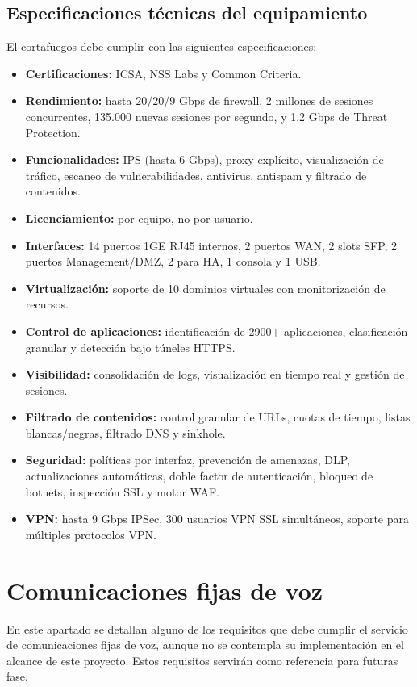 \subsection{Especificaciones técnicas del equipamiento}
\label{subsec:especificaciones_tecnicas_firewall}
\noindent
El cortafuegos debe cumplir con las siguientes especificaciones:
\begin{itemize}
  \item \textbf{Certificaciones:} ICSA, NSS Labs y Common Criteria.
  \item \textbf{Rendimiento:} hasta 20/20/9 Gbps de firewall, 2 millones de sesiones concurrentes, 135.000 nuevas sesiones por segundo, y 1.2 Gbps de Threat Protection.
  \item \textbf{Funcionalidades:} IPS (hasta 6 Gbps), proxy explícito, visualización de tráfico, escaneo de vulnerabilidades, antivirus, antispam y filtrado de contenidos.
  \item \textbf{Licenciamiento:} por equipo, no por usuario.
  \item \textbf{Interfaces:} 14 puertos 1GE RJ45 internos, 2 puertos WAN, 2 slots SFP, 2 puertos Management/DMZ, 2 para HA, 1 consola y 1 USB.
  \item \textbf{Virtualización:} soporte de 10 dominios virtuales con monitorización de recursos.
  \item \textbf{Control de aplicaciones:} identificación de 2900+ aplicaciones, clasificación granular y detección bajo túneles HTTPS.
  \item \textbf{Visibilidad:} consolidación de logs, visualización en tiempo real y gestión de sesiones.
  \item \textbf{Filtrado de contenidos:} control granular de URLs, cuotas de tiempo, listas blancas/negras, filtrado DNS y sinkhole.
  \item \textbf{Seguridad:} políticas por interfaz, prevención de amenazas, DLP, actualizaciones automáticas, doble factor de autenticación, bloqueo de botnets, inspección SSL y motor WAF.
  \item \textbf{VPN:} hasta 9 Gbps IPSec, 300 usuarios VPN SSL simultáneos, soporte para múltiples protocolos VPN.
\end{itemize}

\section{Comunicaciones fijas de voz}
En este apartado se detallan alguno de los requisitos que debe cumplir el servicio de comunicaciones fijas de voz, aunque no se contempla su implementación en el alcance de este proyecto. Estos requisitos servirán como referencia para futuras fase.

